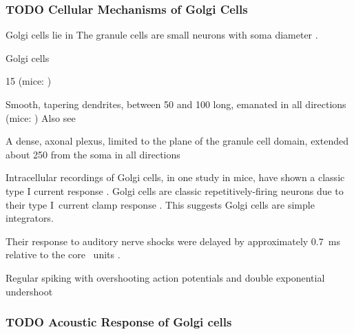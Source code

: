 \subsubsection{TODO Cellular Mechanisms of Golgi Cells}

Golgi cells lie in 
The granule cells are small neurons with soma diameter  \um \citep{MugnainiOsenEtAl:1980}.






Golgi cells                                

 15 \um (mice: \citep{FerragamoGoldingEtAl:1998})                     
 
Smooth, tapering dendrites, between 50 and 100 \um long, emanated in all directions (mice: \citep{FerragamoGoldingEtAl:1998})
Also see \citep{Cant:1993,MugnainiOsenEtAl:1980} 

A dense, axonal plexus, limited to the plane of the granule cell domain, extended about 250 \um
from the soma in all directions \citep{FerragamoGoldingEtAl:1998}


Intracellular recordings of Golgi cells, in one study in mice, have shown a classic type I current response  \citep{FerragamoGoldingEtAl:1998}.
Golgi cells are classic repetitively-firing neurons due to their type I~current clamp response \citep{FerragamoGoldingEtAl:1998}.  
This suggests Golgi cells are simple integrators.  

Their response to auditory nerve shocks were delayed by approximately 0.7~ms relative to the core \VCN~units \citep{FerragamoGoldingEtAl:1998}.

Regular spiking with overshooting action potentials and double exponential undershoot



    
\subsubsection{TODO Acoustic Response of Golgi cells}

